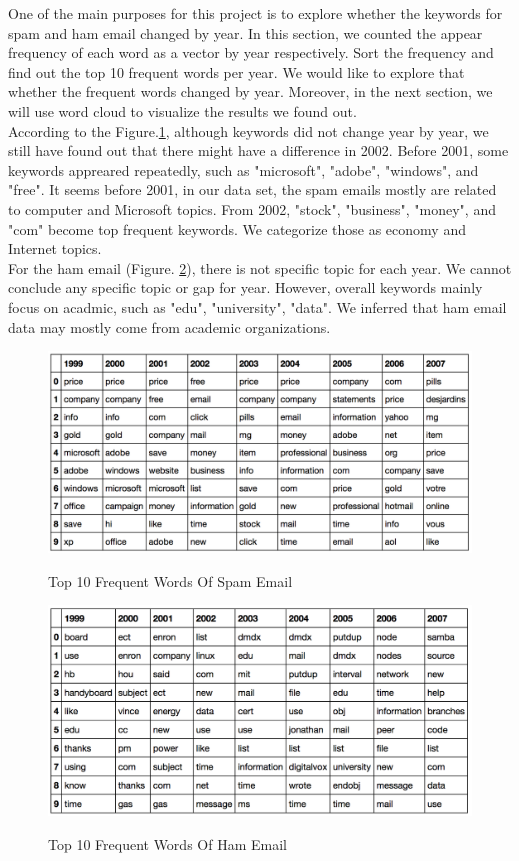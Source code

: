 One of the main purposes for this project is to explore whether the keywords for spam and ham email changed by year. In this section, we counted the appear frequency of each word as a vector by year respectively. Sort the frequency and find out the top 10 frequent words per year. We would like to explore that whether the frequent words changed by year. Moreover, in the next section, we will use word cloud to visualize the results we found out.\\

According to the Figure.\ref{topwordspam}, although keywords did not change year by year, we still have found out that there might have a difference in 2002. Before 2001, some keywords appreared repeatedly, such as "microsoft", "adobe", "windows", and "free". It seems before 2001, in our data set, the spam emails mostly are related to computer and Microsoft topics. From 2002, "stock", "business", "money", and  "com" become top frequent keywords. We categorize those as economy and Internet topics. \\

For the ham email (Figure. \ref{topwordham}), there is not specific topic for each year. We cannot conclude any specific topic or gap for year. However, overall keywords mainly focus on acadmic, such as "edu", "university", "data". We inferred that ham email data may mostly come from academic organizations.

\begin{figure}[ht!]
    \centering
    \includegraphics[width=13cm]{top_word_spam.png}\\
    \caption{Top 10 Frequent Words Of Spam Email}
    \label{topwordspam}
\end{figure}


\begin{figure}[ht!]
    \centering
    \includegraphics[width=13cm]{top_word_ham.png}\\
    \caption{Top 10 Frequent Words Of Ham Email}
    \label{topwordham}
\end{figure}


